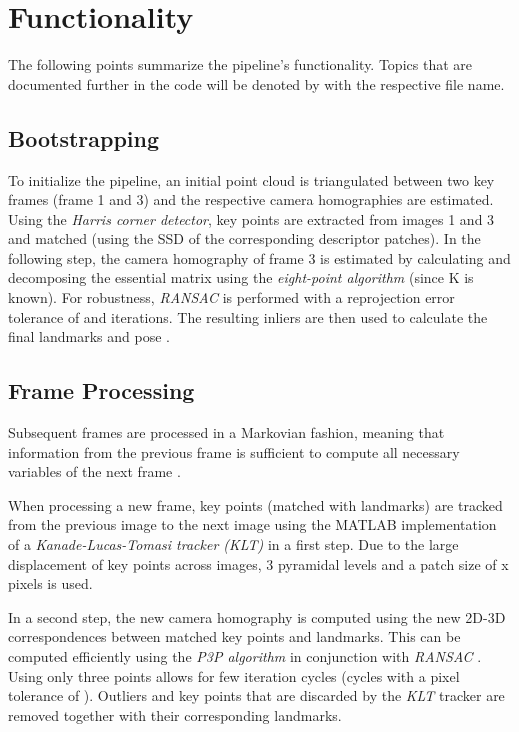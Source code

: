 \chapter{Functionality}
The following points summarize the pipeline's functionality. 
Topics that are documented further in the code will be denoted by  with the respective file name.

\section{Bootstrapping}
To initialize the pipeline, an initial point cloud is triangulated between two key frames (frame 1 and 3) and the respective camera homographies are estimated. 
Using the \emph{Harris corner detector}, key points are extracted from images 1 and 3 and matched (using the SSD of the corresponding descriptor patches).
In the following step, the camera homography of frame 3 is estimated by calculating and decomposing the essential matrix using the \emph{eight-point algorithm} (since K is known). 
For robustness, \emph{RANSAC} is performed with a reprojection error tolerance of \ransacPixelTolerance and \ransacNumIterations iterations. 
The resulting inliers are then used to calculate the final landmarks and pose .      

\section{Frame Processing}
Subsequent frames are processed in a Markovian fashion, meaning that information from the previous frame is sufficient to compute all necessary variables of the next frame . \par
When processing a new frame, key points (matched with landmarks) are tracked from the previous image to the next image using the MATLAB implementation of a \emph{Kanade-Lucas-Tomasi tracker (KLT)}  in a first step. 
Due to the large displacement of key points across images, 3 pyramidal levels and a patch size of \trackerBlocksize x \trackerBlocksize pixels is used. \par
In a second step, the new camera homography is computed using the new 2D-3D correspondences between matched key points and landmarks. 
This can be computed efficiently using the \emph{P3P algorithm} in conjunction with \emph{RANSAC} . 
Using only three points allows for few iteration cycles (\ransacNumIterations cycles with a pixel tolerance of \ransacPixelTolerance). 
Outliers and key points that are discarded by the \emph{KLT} tracker are removed together with their corresponding landmarks.\par

